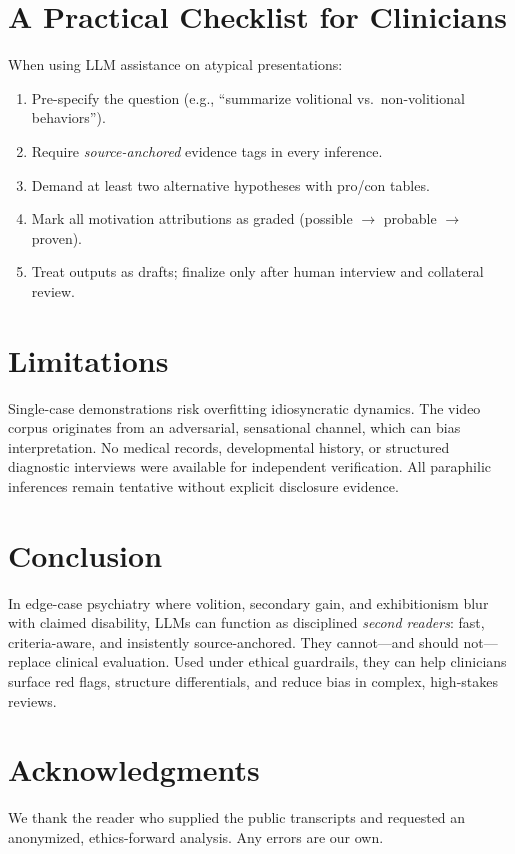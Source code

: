 \documentclass[12pt]{article}
\begin{document}
\section{A Practical Checklist for Clinicians}
When using LLM assistance on atypical presentations:
\begin{enumerate}[leftmargin=2em]
  \item Pre-specify the question (e.g., ``summarize volitional vs.\ non-volitional behaviors'').
  \item Require \emph{source-anchored} evidence tags in every inference.
  \item Demand at least two alternative hypotheses with pro/con tables.
  \item Mark all motivation attributions as graded (possible $\rightarrow$ probable $\rightarrow$ proven).
  \item Treat outputs as drafts; finalize only after human interview and collateral review.
\end{enumerate}

\section{Limitations}
Single-case demonstrations risk overfitting idiosyncratic dynamics. The video corpus originates from an adversarial, sensational channel, which can bias interpretation. No medical records, developmental history, or structured diagnostic interviews were available for independent verification. All paraphilic inferences remain tentative without explicit disclosure evidence.

\section{Conclusion}
In edge-case psychiatry where volition, secondary gain, and exhibitionism blur with claimed disability, LLMs can function as disciplined \emph{second readers}: fast, criteria-aware, and insistently source-anchored. They cannot---and should not---replace clinical evaluation. Used under ethical guardrails, they can help clinicians surface red flags, structure differentials, and reduce bias in complex, high-stakes reviews.

\section*{Acknowledgments}
We thank the reader who supplied the public transcripts and requested an anonymized, ethics-forward analysis. Any errors are our own.
\end{document}
